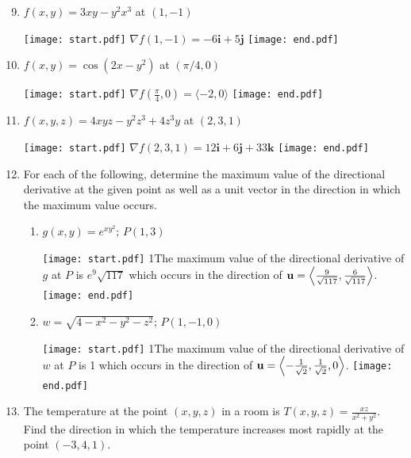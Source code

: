 \documentclass[12pt]{article}
\begin{document}

\begin{enumerate}
\setcounter{enumi}{8}

\item $f(x,y)=3xy-y^2x^3$ at $(1, -1)$ 

\texttt{[image: start.pdf]}
{{$\nabla f(1,-1)=-6\mathbf{i}+5\mathbf{j}$}}
\texttt{[image: end.pdf]}


\item $f(x,y)=\cos{(2x-y^2)}$ at $(\pi/4, 0)$ 

\texttt{[image: start.pdf]}
{{$\nabla f\left(\frac{\pi}{4},0\right) = \langle-2,0\rangle$}}
\texttt{[image: end.pdf]}


\item $f(x,y,z)=4xyz-y^2z^3+4z^3y$ at $(2, 3, 1)$ 

\texttt{[image: start.pdf]}
{{$\nabla f(2,3,1)= 12\mathbf{i}+6\mathbf{j}+33\mathbf{k}$}}
\texttt{[image: end.pdf]}


\item For each of the following, determine the maximum value of the directional derivative at the given point as well as a unit vector in the direction in which the maximum value occurs.

\begin{enumerate}

\item $g(x,y)=e^{xy^2}$; $P(1, 3)$ 

\texttt{[image: start.pdf]}
{{{1\linewidth}{The maximum value of the directional derivative of $g$ at $P$ is $e^{9}\sqrt{117}$ which occurs in the direction of ${\bf u}=\left\langle \frac{9}{\sqrt{117}},\frac{6}{\sqrt{117}}\right\rangle$.}}}
\texttt{[image: end.pdf]}


\item $w=\sqrt{4-x^2-y^2-z^2}$; $P(1, -1, 0)$ 

\texttt{[image: start.pdf]}
{{{1\linewidth}{The maximum value of the directional derivative of $w$ at $P$ is 1 which occurs in the direction of ${\bf u}=\left\langle -\frac{1}{\sqrt{2}}, \frac{1}{\sqrt{2}},0\right\rangle$.}}}
\texttt{[image: end.pdf]}


\end{enumerate}

\item The temperature at the point $(x,y,z)$ in a room is $T(x,y,z)=\frac{xz}{x^2+y^2}$. Find the direction in which the temperature increases most rapidly at the point $(-3, 4,1)$.  


\end{enumerate}
\end{document}
